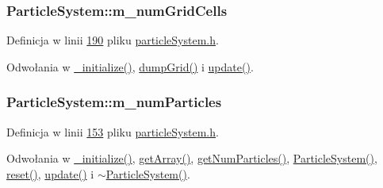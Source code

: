 \hypertarget{class_particle_system_aa1ef17d723af5d7a4685e8fd57e9ca89}{
\subsubsection[{m\-\_\-num\-Grid\-Cells}]{ Particle\-System\-::m\-\_\-num\-Grid\-Cells\hspace{0.3cm}{\ttfamily [protected]}}}\label{class_particle_system_aa1ef17d723af5d7a4685e8fd57e9ca89}


Definicja w linii \hyperlink{particle_system_8h_source_l00190}{190} pliku \hyperlink{particle_system_8h_source}{particle\-System.\-h}.



Odwołania w \hyperlink{particle_system_8cpp_source_l00123}{\-\_\-initialize()}, \hyperlink{particle_system_8cpp_source_l00306}{dump\-Grid()} i \hyperlink{particle_system_8cpp_source_l00238}{update()}.

\hypertarget{class_particle_system_a23d238efa80a647d4b6cde034f486a91}{
\subsubsection[{m\-\_\-num\-Particles}]{ Particle\-System\-::m\-\_\-num\-Particles\hspace{0.3cm}{\ttfamily [protected]}}}\label{class_particle_system_a23d238efa80a647d4b6cde034f486a91}


Definicja w linii \hyperlink{particle_system_8h_source_l00153}{153} pliku \hyperlink{particle_system_8h_source}{particle\-System.\-h}.



Odwołania w \hyperlink{particle_system_8cpp_source_l00123}{\-\_\-initialize()}, \hyperlink{particle_system_8cpp_source_l00346}{get\-Array()}, \hyperlink{particle_system_8h_source_l00048}{get\-Num\-Particles()}, \hyperlink{particle_system_8cpp_source_l00033}{Particle\-System()}, \hyperlink{particle_system_8cpp_source_l00436}{reset()}, \hyperlink{particle_system_8cpp_source_l00238}{update()} i \hyperlink{particle_system_8cpp_source_l00078}{$\sim$\-Particle\-System()}.

